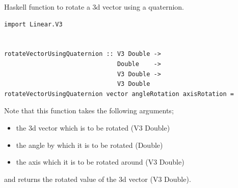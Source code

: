 
\begin{frame}[t, fragile]{Haskell function to rotate a 3d vector using a quaternion.}

\begin{verbatim}
import Linear.V3


rotateVectorUsingQuaternion :: V3 Double ->
                               Double    ->
                               V3 Double ->
                               V3 Double
rotateVectorUsingQuaternion vector angleRotation axisRotation =
\end{verbatim}

Note that this function takes the following arguments;

\begin{itemize}
    \item the 3d vector which is to be rotated (V3 Double)
    \item the angle by which it is to be rotated (Double)
    \item the axis which it is to be rotated around (V3 Double)
\end{itemize}

and returns the rotated value of the 3d vector (V3 Double).

\end{frame}